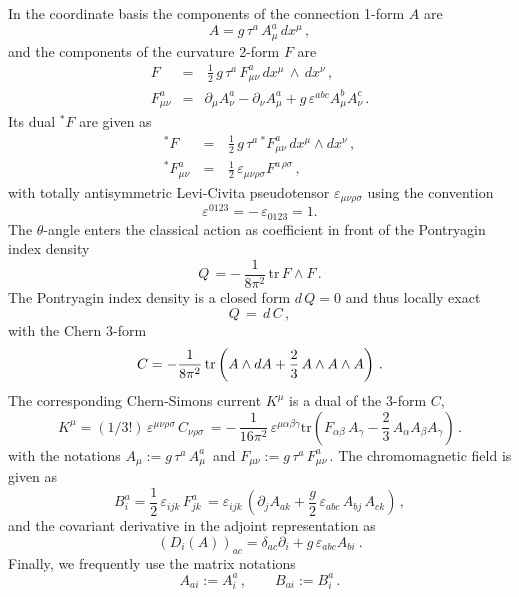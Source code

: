\documentclass[a4paper,12pt]{article}
\begin{document}
In the coordinate basis the components of the connection 1-form $A$ are
\begin{equation}
A = g \, \tau^a \, A_\mu^a \, dx^\mu\,,
\end{equation}
and the components of the curvature 2-form $F$ are
\begin{eqnarray}
F \,& = &\, \frac{1}{2}\, g\, \tau^a\, F^a_{\mu\nu}\, dx^\mu\,
\wedge\, dx^\nu\,,\\
F^a_{\mu\nu}& = &
\partial_\mu A^a_\nu - \partial_\nu A^a_\mu + g \,
\varepsilon^{abc} A^b_\mu A^c_\nu \,.
\end{eqnarray}
Its dual ${}^\ast\! F$ are given as
\begin{eqnarray}
{}^\ast\! F\, & = &\,
\frac{1}{2}\, g \, \tau^a\, {}^\ast\! F^a_{\mu\nu}\, dx^\mu\wedge dx^\nu\,,\\
{}^\ast\! F^a_{\mu\nu}\, &=&\, \frac{1}{2}\, \varepsilon_{\mu\nu\rho\sigma}
F^{a\, \rho\sigma}\,,
\end{eqnarray}
with totally antisymmetric Levi-Civita pseudotensor
$\varepsilon_{\mu\nu\rho\sigma}$ using the convention
\begin{equation}
\varepsilon^{0123} = -\, \varepsilon_{0123} = 1.
\end{equation}
The $\theta$-angle enters the classical action as coefficient in front of
the Pontryagin index density
\begin{equation}
Q\, = -\, \frac{1}{8 \pi^2}\, \mbox{tr} \, F \wedge F\,.
\end{equation}
The Pontryagin index density is a closed form $d\,Q=0$ and thus
locally exact
\begin{equation}\label{eq:topcharge}
Q \, = \, d\,C\,,
\end{equation}
with the Chern 3-form
\begin{equation}
C = - \frac{1}{8 \pi^2}\, {\rm tr}\left( A\wedge dA +
\frac{2}{3}\, A\wedge A\wedge A \right)\,.
\end{equation}
The corresponding Chern-Simons current $K^\mu$
is a dual of the 3-form $C$,
\begin{equation}
K^\mu =
(1/3!)\, \varepsilon^{\mu\nu\rho\sigma}\, C_{\nu\rho\sigma}\,=
-\,\frac{1}{16 \pi^2}\, \varepsilon^{\mu\alpha\beta\gamma}\mbox{tr}
\left(
F_{\alpha\beta}\, A_\gamma - \frac{2}{3}\, A_\alpha A_\beta A_\gamma
\right)\,.
\end{equation}
with the notations $A_\mu :=g \, \tau^a \, A_\mu^a \,$ and
$ F_{\mu\nu} :=g \, \tau^a \, F_{\mu\nu}^a \,$.
The chromomagnetic field is given as
\begin{equation}
B^a_{i} = \frac{1}{2} \, \varepsilon_{ijk}\, F^a_{jk}\, =
\varepsilon_{ijk}\, \left(\partial_j A_{ak} + \frac{g}{2}\,
\varepsilon_{abc}\, A_{bj}\, A_{ck}\right)\,,
\end{equation}
and the covariant derivative in the adjoint representation as
\begin{equation}
\left( D_i (A) \right)_{ac}  =
\delta_{ac} \partial_i +  g\, \varepsilon_{abc} A_{bi}~.
\end{equation}
Finally, we frequently use the matrix notations
\begin{equation}
A_{ai} := A^a_{i}\,,\qquad
B_{ai} := B^a_{i}\,.
\end{equation}
\end{document}
